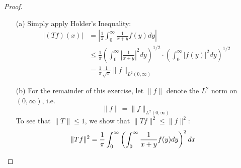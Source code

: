 \documentclass[12pt,leqno]{article}
\numberwithin{equation}{section}
\theoremstyle{definition}
\begin{document}
\begin{enumerate}
\begin{proof}\indent
 \begin{enumerate}
  \item [(a)] Simply apply Holder's Inequality: \begin{align*}|(Tf)(x)|&=\left|\frac{1}{\pi}\int_0^{\infty}\frac{1}{x+y}f(y)dy\right|\\&\leq\frac{1}{\pi}\left(\int_0^{\infty}\left|\frac{1}{x+y}\right|^2dy\right)^{1/2}\cdot\left(\int_0^{\infty}|f(y)|^2dy\right)^{1/2}\\&=\frac{1}{\pi}\frac{1}{\sqrt{x}}\|f\|_{L^2(0,\infty)}\end{align*}
  \item [(b)] For the remainder of this exercise, let $\|f\|$ denote the $L^2$ norm on $(0,\infty)$, i.e. \[\|f\|=\|f\|_{L^2(0,\infty)}\] To see that $\|T\|\leq1$, we show that $\|Tf\|^2\leq\|f\|^2$: \begin{align*}\|Tf\|^2&=\frac{1}{\pi}\int_0^{\infty}\left(\int_0^{\infty}\frac{1}{x+y}f(y)dy\right)^2dx\qedhere\end{align*}
 \end{enumerate}
\end{proof}

\end{enumerate}
\end{document}
